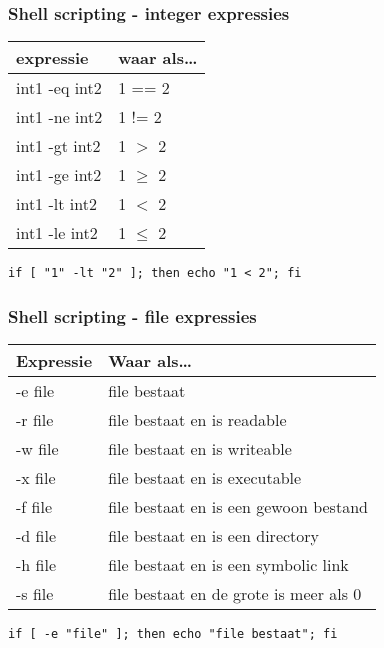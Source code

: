 \documentclass{beamer}
\begin{document}
\begin{frame}[fragile]
  \frametitle{Shell scripting - integer expressies}
  \begin{tabular}[t]{ll}
    expressie & waar als\ldots \\
    \hline
    int1 -eq int2 & 1 == 2\\
    int1 -ne int2 & 1 != 2\\
    int1 -gt int2 & 1 $> $ 2\\
    int1 -ge int2 & 1 $\geq$ 2\\
    int1 -lt int2 & 1 $< $ 2\\
    int1 -le int2 & 1 $\leq$ 2\\
  \end{tabular}
  \begin{lstlisting}
if [ "1" -lt "2" ]; then echo "1 < 2"; fi
  \end{lstlisting}
\end{frame}

\begin{frame}[fragile]
  \frametitle{Shell scripting - file expressies}
  \begin{tabular}[t]{ll}
    Expressie & Waar als\ldots\\
    \hline
    -e file & file bestaat \\
    -r file & file bestaat en is readable \\
    -w file & file bestaat en is writeable \\
    -x file & file bestaat en is executable \\
    -f file & file bestaat en is een gewoon bestand \\
    -d file & file bestaat en is een directory\\
    -h file & file bestaat en is een symbolic link \\
    -s file & file bestaat en de grote is meer als 0 \\
  \end{tabular}
  \begin{lstlisting}
if [ -e "file" ]; then echo "file bestaat"; fi
  \end{lstlisting}%
\end{frame}
\end{document}
